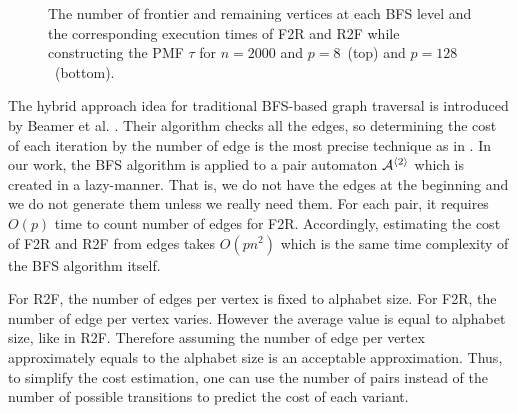 \documentclass[12pt]{article}
\newcommand{\comment}[2]{{\color{red}{\bf (#1: #2)}}}
\begin{document}
\begin{figure}[ht]
{	}
	\caption{The number of frontier and remaining vertices at each BFS level and the corresponding execution times of F2R and R2F while constructing the PMF $\tau$ for $n = 2000$ and $p = 8$~(top) and $p=128$~(bottom). 
\comment{sertac}{sayilardaki virguller nokta olmali.}}%
	
	\label{fig:BFS-vtcomparison}
\end{figure}

The hybrid approach idea for traditional BFS-based graph traversal is introduced by Beamer et al. \cite{Beamer}. Their algorithm checks all the edges, so determining the cost of each iteration by the number of edge is the most precise technique as in \cite{Beamer}. In our work, the BFS algorithm is applied to a pair automaton ${\cal A}^{\langle 2 \rangle}$ which is created in a lazy-manner. That is, we do not have the edges at the beginning and we do not generate them unless we really need them. For each pair, it requires $O(p)$ time to count number of edges for F2R. Accordingly, estimating the cost of F2R and R2F from edges takes $O(pn^2)$ which is the same time complexity of the BFS algorithm itself. 

For R2F, the number of edges per vertex is fixed to alphabet size. For F2R, the number of edge per vertex varies. However the average value is equal to alphabet size, like in R2F. Therefore assuming the number of edge per vertex approximately equals to the alphabet size is an acceptable approximation. Thus, to simplify the cost estimation, one can use the number of pairs instead of the number of possible transitions to predict the cost of each variant.
\end{document}
